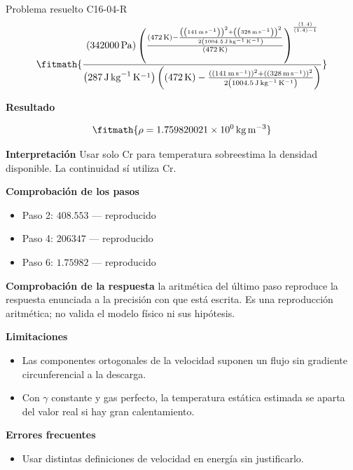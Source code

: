 \documentclass[10pt,openany]{book}
\begin{document}
\begin{studiumworked}{Problema resuelto C16-04-R}
\[
\fitmath{\frac{\left(342000\,\mathrm{Pa}\right) \left(\frac{\left(472\,\mathrm{K}\right) - \frac{\left(\left(141\,\mathrm{m}\,\mathrm{s}^{-1}\right)\right)^{2} + \left(\left(328\,\mathrm{m}\,\mathrm{s}^{-1}\right)\right)^{2}}{2 \left(1004.5\,\mathrm{J}\,\mathrm{kg}^{-1}\,\mathrm{K}^{-1}\right)}}{\left(472\,\mathrm{K}\right)}\right)^{\frac{\left(1.4\right)}{\left(1.4\right) - 1}}}{\left(287\,\mathrm{J}\,\mathrm{kg}^{-1}\,\mathrm{K}^{-1}\right) \left(\left(472\,\mathrm{K}\right) - \frac{\left(\left(141\,\mathrm{m}\,\mathrm{s}^{-1}\right)\right)^{2} + \left(\left(328\,\mathrm{m}\,\mathrm{s}^{-1}\right)\right)^{2}}{2 \left(1004.5\,\mathrm{J}\,\mathrm{kg}^{-1}\,\mathrm{K}^{-1}\right)}\right)}}
\]

\noindent\textbf{Resultado}

\[
\fitmath{\rho=1.759820021\times10^{0}\,\mathrm{kg}\,\mathrm{m}^{-3}}
\]

\noindent\textbf{Interpretación}
Usar solo Cr para temperatura sobreestima la densidad disponible. La continuidad sí utiliza Cr.

\noindent\textbf{Comprobación de los pasos}
\begin{itemize}
\item Paso 2: $408.553$ — reproducido
\item Paso 4: $206347$ — reproducido
\item Paso 6: $1.75982$ — reproducido
\end{itemize}

\noindent\textbf{Comprobación de la respuesta} la aritmética del último paso reproduce la respuesta enunciada a la precisión con que está escrita. Es una reproducción aritmética; no valida el modelo físico ni sus hipótesis.

\noindent\textbf{Limitaciones}
\begin{itemize}
\item Las componentes ortogonales de la velocidad suponen un flujo sin gradiente circunferencial a la descarga.
\item Con $\gamma$ constante y gas perfecto, la temperatura estática estimada se aparta del valor real si hay gran calentamiento.
\end{itemize}

\noindent\textbf{Errores frecuentes}
\begin{itemize}
\item Usar distintas definiciones de velocidad en energía sin justificarlo.
\end{itemize}
\end{studiumworked}
\end{document}
